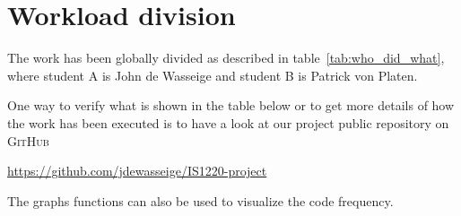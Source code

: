 \section{Workload division} %
\label{app:who_did_what}
The work has been globally divided as described in table~\ref{tab:who_did_what},
where student A is John de Wasseige and student B is Patrick von Platen.

One way to verify what is shown in the table below or 
to get more details of how the work has been executed
is to have a look at our project public repository on \textsc{GitHub}
\begin{center}
  \url{https://github.com/jdewasseige/IS1220-project}
\end{center}
The graphs functions can also be used to visualize the code frequency.

